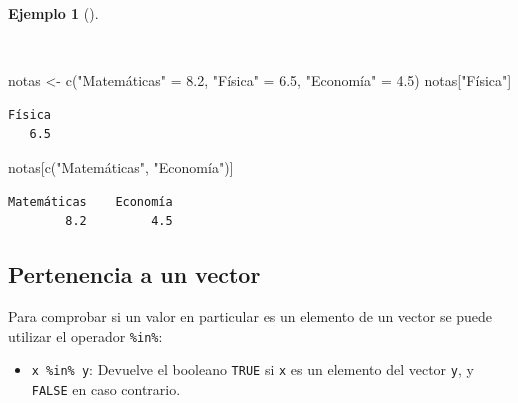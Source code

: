 \documentclass[
  a4paper,
]{scrreport}
\newenvironment{Shaded}{\begin{snugshade}}{\end{snugshade}}
\newcommand{\FloatTok}[1]{\textcolor[rgb]{0.68,0.00,0.00}{#1}}
\newcommand{\FunctionTok}[1]{\textcolor[rgb]{0.28,0.35,0.67}{#1}}
\newcommand{\NormalTok}[1]{\textcolor[rgb]{0.00,0.23,0.31}{#1}}
\newcommand{\OtherTok}[1]{\textcolor[rgb]{0.00,0.23,0.31}{#1}}
\newcommand{\StringTok}[1]{\textcolor[rgb]{0.13,0.47,0.30}{#1}}
\providecommand{\tightlist}{%
  \setlength{\itemsep}{0pt}\setlength{\parskip}{0pt}}\usepackage{longtable,booktabs,array}
\theoremstyle{definition}
\theoremstyle{definition}
\newtheorem{example}{Ejemplo}[chapter]
\theoremstyle{remark}
\begin{document}
\begin{example}[]\protect\hypertarget{exm-acceso-vector-nombres}{}\label{exm-acceso-vector-nombres}

~

\begin{Shaded}
\begin{Highlighting}[]
\NormalTok{notas }\OtherTok{\textless{}{-}} \FunctionTok{c}\NormalTok{(}\StringTok{"Matemáticas"} \OtherTok{=} \FloatTok{8.2}\NormalTok{, }\StringTok{"Física"} \OtherTok{=} \FloatTok{6.5}\NormalTok{, }\StringTok{"Economía"} \OtherTok{=} \FloatTok{4.5}\NormalTok{)}
\NormalTok{notas[}\StringTok{"Física"}\NormalTok{]}
\end{Highlighting}
\end{Shaded}

\begin{verbatim}
Física 
   6.5 
\end{verbatim}

\begin{Shaded}
\begin{Highlighting}[]
\NormalTok{notas[}\FunctionTok{c}\NormalTok{(}\StringTok{"Matemáticas"}\NormalTok{, }\StringTok{"Economía"}\NormalTok{)]}
\end{Highlighting}
\end{Shaded}

\begin{verbatim}
Matemáticas    Economía 
        8.2         4.5 
\end{verbatim}

\end{example}

\subsection{Pertenencia a un vector}\label{pertenencia-a-un-vector}

Para comprobar si un valor en particular es un elemento de un vector se
puede utilizar el operador \texttt{\%in\%}:

\begin{itemize}
\tightlist
\item
  \texttt{x\ \%in\%\ y}: Devuelve el booleano \texttt{TRUE} si
  \texttt{x} es un elemento del vector \texttt{y}, y \texttt{FALSE} en
  caso contrario.
\end{itemize}
\end{document}
